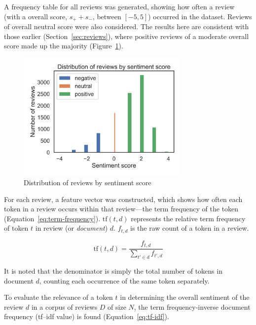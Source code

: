 \documentclass[11pt, a4paper]{pancake-article}
\begin{document}
A frequency table for all reviews was generated, showing how
often a review (with a overall score, \(s_+ + s_-\), between
\(\left[-5, 5\right]\))
occurred in the dataset. Reviews of overall neutral score were also considered.
The results here are consistent with those earlier (Section~\ref{sec:reviews}),
where positive reviews of a moderate overall score made up the
majority (Figure~\ref{fig:distribution}).

\begin{figure}[htpb]
  \centering
  \includegraphics[width=0.75\textwidth]{../results/old/distribution.png}
  \caption{Distribution of reviews by sentiment score}
  \label{fig:distribution}
\end{figure}

For each review, a feature vector was constructed, which shows how
often each token in a review occurs within that review---the term frequency
of the token (Equation~\ref{eq:term-frequency}). \(\text{tf}\left(t, d\right)\)
represents the relative term frequency of token \(t\) in review (or
\textit{document})
\(d\). \(f_{t, d}\) is the raw count of a token in a review.

\begin{equation}
  \text{tf}\left(t, d\right) = \frac{f_{t, d}}{\sum_{t' \in d}^{}f_{t',d}}
  \label{eq:term-frequency}
\end{equation}

It is noted that the denominator is simply the total number of tokens
in document \(d\),
counting each occurrence of the same token separately.

To evaluate the relevance of a token \(t\) in determining the overall
sentiment of the
review \(d\) in a corpus of reviews \(D\) of size \(N\), the term
frequency-inverse document frequency
(tf--idf value) is found (Equation~\ref{eq:tf-idf}).
\end{document}
